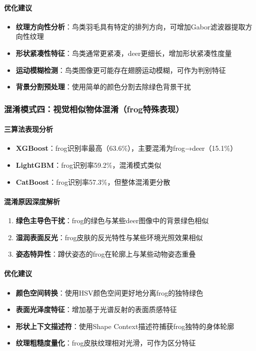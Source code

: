\documentclass[UTF8]{report}
\theoremstyle{MyLineTheoremStyle} %
\theoremstyle{MyBlockTheoremStyle} %
\theoremstyle{MySubsubsectionStyle} %
\begin{document}
\paragraph{优化建议}
\begin{itemize}
    \item \textbf{纹理方向性分析}：鸟类羽毛具有特定的排列方向，可增加Gabor滤波器提取方向性纹理
    \item \textbf{形状紧凑性特征}：鸟类通常更紧凑，deer更细长，增加形状紧凑性度量
    \item \textbf{运动模糊检测}：鸟类图像更可能存在翅膀运动模糊，可作为判别特征
    \item \textbf{背景分割预处理}：使用简单的颜色分割去除绿色背景干扰
\end{itemize}

\subsubsection{混淆模式四：视觉相似物体混淆（frog特殊表现）}
\paragraph{三算法表现分析}
\begin{itemize}
    \item \textbf{XGBoost}：frog识别率最高（63.6\%），主要混淆为frog→deer（15.1\%）
    \item \textbf{LightGBM}：frog识别率59.2\%，混淆模式类似
    \item \textbf{CatBoost}：frog识别率57.3\%，但整体混淆更分散
\end{itemize}
\paragraph{混淆原因深度解析}
\begin{enumerate}
    \item \textbf{绿色主导色干扰}：frog的绿色与某些deer图像中的背景绿色相似
    \item \textbf{湿润表面反光}：frog皮肤的反光特性与某些环境光照效果相似
    \item \textbf{姿态特异性}：蹲伏姿态的frog在轮廓上与某些动物姿态重叠
\end{enumerate}
\paragraph{优化建议}
\begin{itemize}
    \item \textbf{颜色空间转换}：使用HSV颜色空间更好地分离frog的独特绿色
    \item \textbf{表面光泽度特征}：增加基于光谱反射的表面质感特征
    \item \textbf{形状上下文描述符}：使用Shape Context描述符捕获frog独特的身体轮廓
    \item \textbf{纹理粗糙度量化}：frog皮肤纹理相对光滑，可作为区分特征
\end{itemize}
\end{document}
